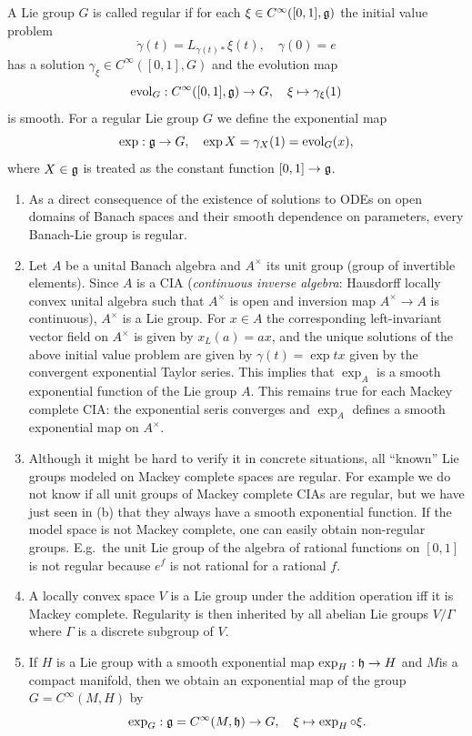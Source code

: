 \begin{defn}
    A Lie group $G$ is called regular if for each $\xi\in C^\infty([0,1],\mathfrak{g})$ the initial value problem
    \[\dot\gamma(t)=L_{\gamma(t)\ast}\xi(t),\quad \gamma(0)=e\]
    has a solution $\gamma_\xi\in C^\infty([0,1],G)$ and the evolution map 
    \[\mathrm{evol}_G:C^\infty([0,1],\mathfrak{g})\to G,\quad \xi\mapsto \gamma_\xi(1)\]
    is smooth. For a regular Lie group $G$ we define the exponential map
    \[\exp:\mathfrak{g}\to G,\quad \exp X=\gamma_X(1)=\mathrm{evol}_G(x),\]
    where $X\in\mathfrak{g}$ is treated as the constant function $[0,1]\to \mathfrak{g}$.
\end{defn}
\begin{rem}
    \begin{enumerate}[label=(\alph*)]
        \item As a direct consequence of the existence of solutions to ODEs on open domains of Banach spaces and their smooth dependence on parameters, every Banach-Lie group is regular.
        \item Let $A$ be a unital Banach algebra and $A^\times$ its unit group (group of invertible elements). Since $A$ is a CIA (\emph{continuous inverse algebra}: Hausdorff locally convex unital algebra such that $A^\times$ is open and inversion map $A^\times\to A$ is continuous), $A^\times$ is a Lie group. For $x\in A$ the corresponding left-invariant vector field on $A^\times$ is given by $x_L(a)=ax$, and the unique solutions of the above initial value problem are given by $\gamma(t)=\exp tx$ given by the convergent exponential Taylor series. This implies that $\exp_A$ is a smooth exponential function of the Lie group $A$. This remains true for each Mackey complete CIA: the exponential seris converges and $\exp_A$ defines a smooth exponential map on $A^\times$.
        \item Although it might be hard to verify it in concrete situations, all ``known'' Lie groups modeled on Mackey complete spaces are regular. For example we do not know if all unit groups of Mackey complete CIAs are regular, but we have just seen in (b) that they always have a smooth exponential function. If the model space is not Mackey complete, one can easily obtain non-regular groups. E.g.\ the unit Lie group of the algebra of rational functions on $[0,1]$ is not regular because $e^f$ is not rational for a rational $f$.
        \item A locally convex space $V$ is a Lie group under the addition operation iff it is Mackey complete. Regularity is then inherited by all abelian Lie groups $V\slash \Gamma$ where $\Gamma$ is a discrete subgroup of $V$.
        \item If $H$ is a Lie group with a smooth exponential map $\exp_H:\mathfrak{h}\to H$ and $M$is a compact manifold, then we obtain an exponential map of the group $G=C^\infty(M,H)$ by
        \[\exp_G:\mathfrak{g}=C^\infty(M,\mathfrak{h})\to G,\quad \xi\mapsto \exp_H\circ \xi.\]
    \end{enumerate}
\end{rem}

